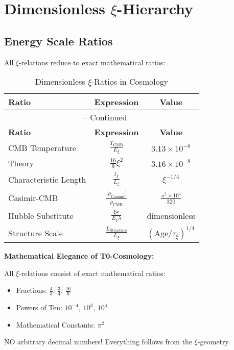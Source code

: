 \documentclass[12pt,a4paper]{article}
\newcommand{\xipar}{\xi}
\newcommand{\Lxi}{L_\xi}
\newcommand{\Exi}{E_\xi}
\newcommand{\rhoCMB}{\rho_{\text{CMB}}}
\newcommand{\rhoCasimir}{\rho_{\text{Casimir}}}
\begin{document}
	\section{Dimensionless $\xi$-Hierarchy}
	
	\subsection{Energy Scale Ratios}
	
	All $\xi$-relations reduce to exact mathematical ratios:
	
	\begin{longtable}{lcc}
		\caption{Dimensionless $\xi$-Ratios in Cosmology} \\
		\toprule
		\textbf{Ratio} & \textbf{Expression} & \textbf{Value} \\
		\midrule
		\endfirsthead
		\multicolumn{3}{c}{\tablename\ \thetable{} -- Continued} \\
		\toprule
		\textbf{Ratio} & \textbf{Expression} & \textbf{Value} \\
		\midrule
		\endhead
		CMB Temperature & $\frac{T_{\text{CMB}}}{\Exi}$ & $3.13 \times 10^{-8}$ \\
		Theory & $\frac{16}{9}\xipar^2$ & $3.16 \times 10^{-8}$ \\
		Characteristic Length & $\frac{\ell_{\xipar}}{\Lxi}$ & $\xipar^{-1/4}$ \\
		Casimir-CMB & $\frac{|\rhoCasimir|}{\rhoCMB}$ & $\frac{\pi^2 \times 10^4}{320}$ \\
		Hubble Substitute & $\frac{\xipar x}{\Exi \lambda}$ & dimensionless \\
		Structure Scale & $\frac{L_{\text{Structure}}}{\Lxi}$ & $(\text{Age}/\tau_\xi)^{1/4}$ \\
		\bottomrule
	\end{longtable}
	
	\begin{warning}
		\textbf{Mathematical Elegance of T0-Cosmology:}
		
		All $\xi$-relations consist of exact mathematical ratios:
		\begin{itemize}
			\item Fractions: $\frac{4}{3}$, $\frac{3}{4}$, $\frac{16}{9}$
			\item Powers of Ten: $10^{-4}$, $10^3$, $10^4$
			\item Mathematical Constants: $\pi^2$
		\end{itemize}
		
		NO arbitrary decimal numbers! Everything follows from the $\xi$-geometry.
	\end{warning}
	
\end{document}
